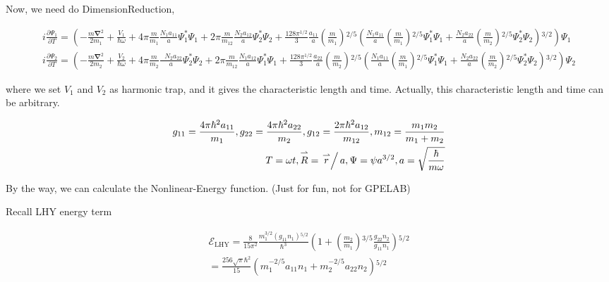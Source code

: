 Now, we need do DimensionReduction, 

\begin{equation}
\begin{split}
i \frac{\partial \Psi _1}{\partial T}=\left(-\frac{m\pmb{\nabla }^2}{2m_1}+\frac{V_1}{\hbar  \omega }+4\pi  \frac{m}{m_1}\frac{ N_1a_{11}}{a}\Psi
_1^*\Psi _1+2\pi \frac{ m }{m_{12}}\frac{N_2a_{12}}{a}\Psi _2^*\Psi _2+\frac{128\pi ^{1/2} }{3} \frac{a_{11}}{a}\left(\frac{m}{m_1}\right){}^{2/5}\left(
\frac{N_1a_{11}}{a}\left(\frac{m}{m_1}\right){}^{2/5}\Psi _1^*\Psi _1+ \frac{N_2a_{22}}{a}\left(\frac{m}{m_2}\right){}^{2/5}\Psi _2^*\Psi _2\right){}^{3/2}\right)\Psi
_1\\
i \frac{\partial \Psi _2}{\partial T}=\left(-\frac{m\pmb{\nabla }^2}{2m_2}+\frac{V_2}{\hbar  \omega }+4\pi  \frac{m}{m_2}\frac{\text{  }N_2a_{22}}{a}\Psi
_2^*\Psi _2+2\pi \frac{ m }{m_{12}}\frac{N_1a_{12}}{a}\Psi _1^*\Psi _1+\frac{128\pi ^{1/2} }{3}\frac{a_{22}}{a}\left(\frac{m}{m_2}\right){}^{2/5}\left(
\frac{N_1a_{11}}{a}\left(\frac{m}{m_1}\right){}^{2/5}\Psi _1^*\Psi _1+ \frac{N_2a_{22}}{a}\left(\frac{m}{m_2}\right){}^{2/5}\Psi _2^*\Psi _2\right){}^{3/2}\right)\Psi
_2
\end{split}
\end{equation}

where we set \(V_1\) and \(V_2\) as harmonic trap, and it gives the characteristic length and time. Actually, this characteristic length and time
can be arbitrary.

\begin{equation}
\begin{split}
g_{11}=\frac{4\pi  \hbar ^2a_{11}}{m_1}, g_{22}=\frac{4\pi  \hbar ^2a_{22}}{m_2}, g_{12}=\frac{2\pi  \hbar ^2a_{12}}{m_{12}}, m_{12}=\frac{m_1m_2}{m_1+m_2}\\
T=\omega  t, \overset{\rightharpoonup }{R}=\left.\overset{\rightharpoonup }{r}\right/a, \Psi =\psi  a^{3/2}, a=\sqrt{\frac{\hbar }{m \omega }}
\end{split}
\end{equation}

By the way, we can calculate the Nonlinear-Energy function. (Just for fun, not for GPELAB)

Recall LHY energy term

\begin{equation}
\begin{split}
\mathcal{E}_{\text{LHY}}=\frac{8}{15\pi ^2}\frac{m_1^{3/2}\left(g_{11}n_1\right){}^{5/2}}{\hbar ^3}\left(1+\left(\frac{m_2}{m_1}\right){}^{3/5}\frac{g_{22}n_2}{g_{11}n_1}\right){}^{5/2}\\
=\frac{256\sqrt{\pi }\hbar ^2}{15}\left(m_1^{-2/5}a_{11}n_1+m_2^{-2/5}a_{22}n_2\right){}^{5/2}
\end{split}
\end{equation}

